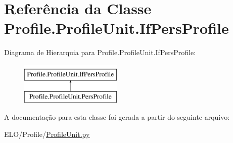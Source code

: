 \hypertarget{classProfile_1_1ProfileUnit_1_1IfPersProfile}{\section{Referência da Classe Profile.\-Profile\-Unit.\-If\-Pers\-Profile}
\label{d2/dec/classProfile_1_1ProfileUnit_1_1IfPersProfile}
}
Diagrama de Hierarquia para Profile.\-Profile\-Unit.\-If\-Pers\-Profile\-:\begin{figure}[H]
\begin{center}
\leavevmode
\includegraphics[height=2.000000cm]{d2/dec/classProfile_1_1ProfileUnit_1_1IfPersProfile}
\end{center}
\end{figure}


A documentação para esta classe foi gerada a partir do seguinte arquivo\-:\begin{DoxyCompactItemize}
\item 
E\-L\-O/\-Profile/\hyperlink{ProfileUnit_8py}{Profile\-Unit.\-py}\end{DoxyCompactItemize}
